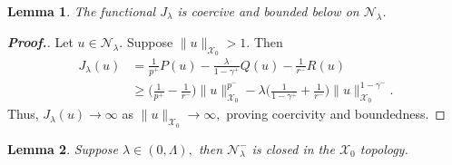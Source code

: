\documentclass[11pt]{article}
\newtheorem{lemma}{Lemma}[section] %
\newcommand{\X}{\mathcal{X}_{0}}
\begin{document}
\begin{lemma}\label{lm:bdd_blw}
The functional $J_\lambda$
is coercive and bounded below on 
$\mathcal{N}_\lambda$.
\end{lemma}


\begin{proof}[\bf Proof.]
Let $u \in \mathcal{N}_\lambda.$
Suppose $\|u\|_{\X} > 1.$
Then
\begin{align*}
J_\lambda(u) &= 
\frac{1}{p^+} P(u) - 
\frac{\lambda}{1 - \gamma^+} Q(u) - 
\frac{1}{r^-} R(u) \\
&\geq 
\Big ( 
\frac{1}{p^+} - 
\frac{1}{r^-} 
\Big ) \|u\|_{\X}^{p^-} - \lambda 
\Big ( 
\frac{1}{1 - \gamma^+} + 
\frac{1}{r^-} 
\Big ) \|u\|_{\X}^{1 - \gamma^-}.
\end{align*}
Thus, $J_\lambda(u) \to \infty$
as $\|u\|_{\X} \to \infty,$
proving coercivity and boundedness.
\end{proof}

\smallskip

\begin{lemma}
Suppose $\lambda \in (0, \Lambda),$
then $\mathcal{N}_\lambda^-$
is closed in the $\X$
topology.
\end{lemma}
\end{document}
